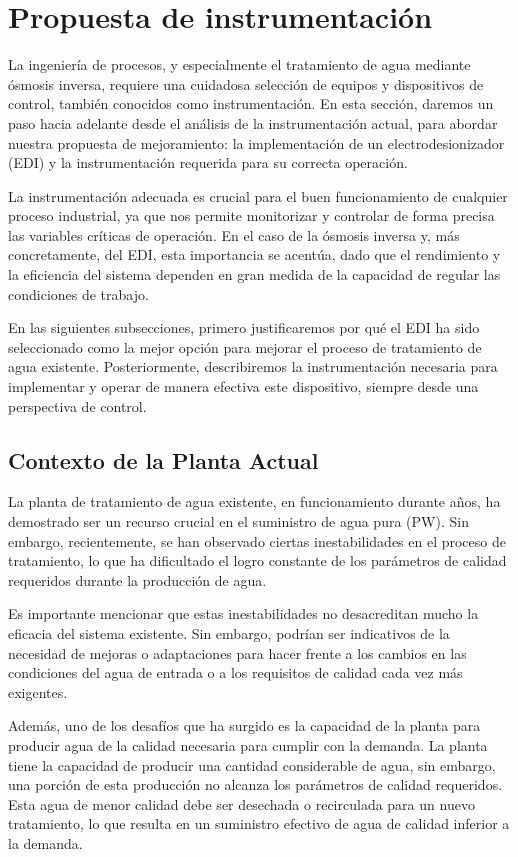\section{Propuesta de instrumentación}

La ingeniería de procesos, y especialmente el tratamiento de agua mediante ósmosis inversa, requiere una cuidadosa selección de equipos y dispositivos de control, también conocidos como instrumentación. En esta sección, daremos un paso hacia adelante desde el análisis de la instrumentación actual, para abordar nuestra propuesta de mejoramiento: la implementación de un electrodesionizador (EDI) y la instrumentación requerida para su correcta operación.

La instrumentación adecuada es crucial para el buen funcionamiento de cualquier proceso industrial, ya que nos permite monitorizar y controlar de forma precisa las variables críticas de operación. En el caso de la ósmosis inversa y, más concretamente, del EDI, esta importancia se acentúa, dado que el rendimiento y la eficiencia del sistema dependen en gran medida de la capacidad de regular las condiciones de trabajo.

En las siguientes subsecciones, primero justificaremos por qué el EDI ha sido seleccionado como la mejor opción para mejorar el proceso de tratamiento de agua existente. Posteriormente, describiremos la instrumentación necesaria para implementar y operar de manera efectiva este dispositivo, siempre desde una perspectiva de control.


\subsection{Contexto de la Planta Actual}

La planta de tratamiento de agua existente, en funcionamiento durante años,
ha demostrado ser un recurso crucial en el suministro de agua pura (PW).
Sin embargo, recientemente, se han observado ciertas inestabilidades en el
proceso de tratamiento, lo que ha dificultado el logro constante de los parámetros
de calidad requeridos durante la producción de agua.

Es importante mencionar que estas inestabilidades no desacreditan mucho la eficacia
del sistema existente. Sin embargo, podrían ser indicativos de la necesidad
de mejoras o adaptaciones para hacer frente a los cambios en las condiciones
del agua de entrada o a los requisitos de calidad cada vez más exigentes.

Además, uno de los desafíos que ha surgido es la capacidad de la
planta para producir agua de la calidad necesaria para cumplir con la demanda.
La planta tiene la capacidad de producir una cantidad considerable de agua,
sin embargo, una porción de esta producción no alcanza los parámetros de
calidad requeridos. Esta agua de menor calidad debe ser desechada o
recirculada para un nuevo tratamiento, lo que resulta en un suministro
efectivo de agua de calidad inferior a la demanda.

